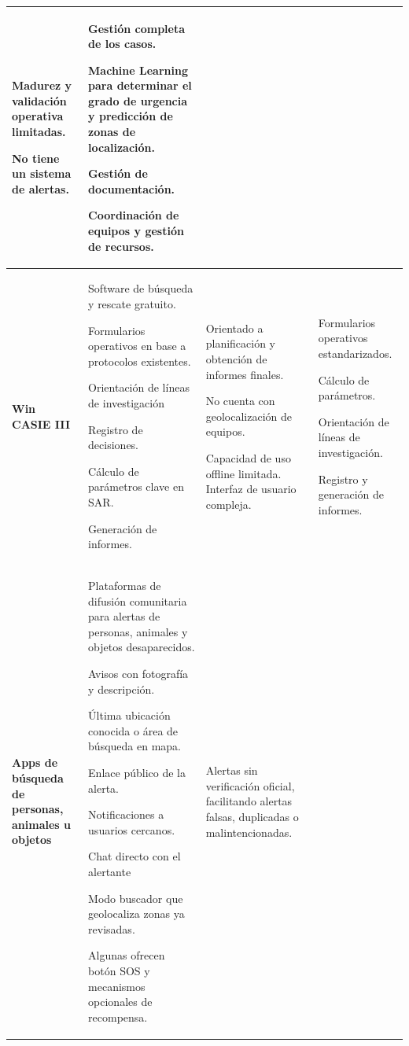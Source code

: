 \begin{table}[htbp]
\begin{tabular}{ |m{2cm}|m{5cm}|m{4cm}|m{3cm}|  }
{    Madurez y validación operativa limitadas.
    
    No tiene un sistema de alertas.
    } 
    & {Gestión completa de los casos.

    Machine Learning para determinar el grado de urgencia y predicción de zonas de localización.
    
    Gestión de documentación.
    
    Coordinación de equipos y gestión de recursos. 
    }\\
\hline
\cellcolor[HTML]{EFEFEF}\textbf{Win CASIE III} 
    & {Software de búsqueda y rescate gratuito.

    Formularios operativos en base a protocolos existentes.
    
    Orientación de líneas de investigación
    
    Registro de decisiones.
    
    Cálculo de parámetros clave en SAR.
    
    Generación de informes.
    } 
    & {Orientado a planificación y obtención de informes finales.

    No cuenta con geolocalización de equipos.
    
    Capacidad de uso offline limitada. Interfaz de usuario compleja.
    } 
    & {Formularios operativos estandarizados.

    Cálculo de parámetros.
    
    Orientación de líneas de investigación.
    
    Registro y generación de informes.
    }\\
\hline
\cellcolor[HTML]{EFEFEF}\textbf{Apps de búsqueda de personas, animales u objetos}
    & {Plataformas de difusión comunitaria para alertas de personas, animales y objetos desaparecidos.
    
    Avisos con fotografía y descripción.
    
    Última ubicación conocida o área de búsqueda en mapa.
    
    Enlace público de la alerta.
    
    Notificaciones a usuarios cercanos.
    
    Chat directo con el alertante
    
    Modo buscador que geolocaliza zonas ya revisadas.
    
    Algunas ofrecen botón SOS y mecanismos opcionales de recompensa.
    }
    & {Alertas sin verificación oficial, facilitando alertas falsas, duplicadas o malintencionadas.
    
}
\end{tabular}
\end{table}
